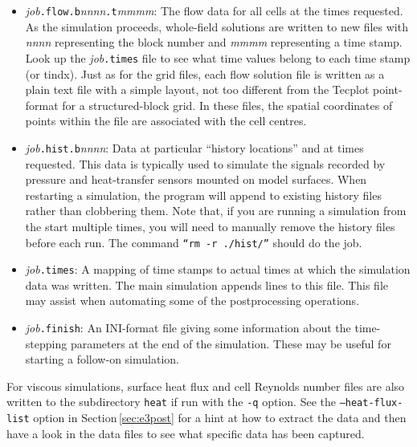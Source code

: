          \begin{itemize}
           \item \textit{job}\texttt{.flow.b}\textit{nnnn}\texttt{.t}\textit{mmmm}:
             The flow data for all cells at the times requested.
             As the simulation proceeds, whole-field solutions are written
             to new files with \textit{nnnn} representing the block number and
             \textit{mmmm} representing a time stamp.
             Look up the \textit{job}\texttt{.times} file to see what time values
             belong to each time stamp (or tindx).
             Just as for the grid files, each flow solution file is written 
             as a plain text file with a simple layout, not too different from 
             the Tecplot point-format for a structured-block grid.
             In these files, the spatial coordinates of points within the file are
             associated with the cell centres.
           \item  \textit{job}\texttt{.hist.b}\textit{nnnn}: 
             Data at particular ``history locations'' and at times requested.
             This data is typically used to simulate the signals recorded by pressure 
             and heat-transfer sensors mounted on model surfaces.
             When restarting a simulation, the program will append to existing history files 
             rather than clobbering them.
             Note that, if you are running a simulation from the start multiple times, 
             you will need to manually remove the history files before each run.  
             The command \texttt{``rm -r ./hist/''} should do the job.
           \item  \textit{job}\texttt{.times}: 
             A mapping of time stamps to actual times at which the simulation
             data was written.
             The main simulation appends lines to this file.
             This file may assist when automating some of the postprocessing operations.
           \item  \textit{job}\texttt{.finish}: 
             An INI-format file giving some information about the time-stepping parameters
             at the end of the simulation.
             These may be useful for starting a follow-on simulation.
         \end{itemize}

\medskip
For viscous simulations, surface heat flux and cell Reynolds number files are also written to the subdirectory \texttt{heat}
if run with the \verb!-q! option.
See the \texttt{--heat-flux-list} option in Section\,\ref{sec:e3post} for a hint at how to extract the data and then
have a look in the data files to see what specific data has been captured. 

